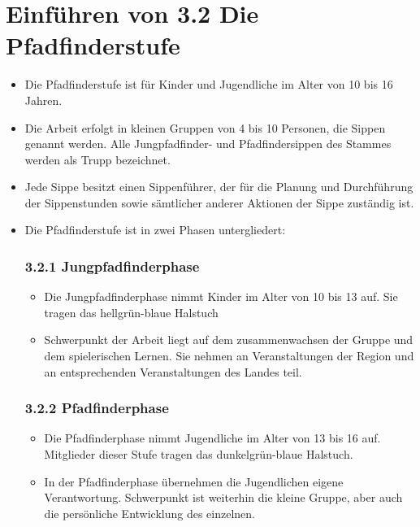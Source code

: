 \documentclass[a4paper]{article}
\begin{document}
\section{Einführen von 3.2 Die Pfadfinderstufe} %
\label{sec:anpassung_der_ordnung_auf_die_neue_beauftragung}
    \label{sub:die_pfadfinderstufe}
    \begin{itemize}
        \item Die Pfadfinderstufe ist für Kinder und Jugendliche im Alter von 10 bis 16 Jahren. 
        \item Die Arbeit erfolgt in kleinen Gruppen von 4 bis 10 Personen, die Sippen genannt werden. Alle Jungpfadfinder- und Pfadfindersippen des Stammes werden als Trupp bezeichnet.
        \item Jede Sippe besitzt einen Sippenführer, der für die Planung und Durchführung der Sippenstunden sowie sämtlicher anderer Aktionen der Sippe zuständig ist. 
        \item Die Pfadfinderstufe ist in zwei Phasen untergliedert:
        \subsubsection*{3.2.1 Jungpfadfinderphase} %
        \label{ssub:jungpfadfinderphase}
            \begin{itemize}
                \item Die Jungpfadfinderphase nimmt Kinder im Alter von 10 bis 13 auf. Sie tragen das hellgrün-blaue Halstuch 
                \item Schwerpunkt der Arbeit liegt auf dem zusammenwachsen der Gruppe und dem spielerischen Lernen. Sie nehmen an Veranstaltungen der Region und an entsprechenden Veranstaltungen des Landes teil.
            \end{itemize}
        \subsubsection*{3.2.2 Pfadfinderphase} %
        \label{ssub:pfadfinderphase}
        \begin{itemize}
            \item Die Pfadfinderphase nimmt Jugendliche im Alter von 13 bis 16 auf. Mitglieder dieser Stufe tragen das dunkelgrün-blaue Halstuch.
            \item In der Pfadfinderphase übernehmen die Jugendlichen eigene Verantwortung. Schwerpunkt ist weiterhin die kleine Gruppe, aber auch die persönliche Entwicklung des einzelnen.
        \end{itemize}
    \end{itemize}
\end{document}
